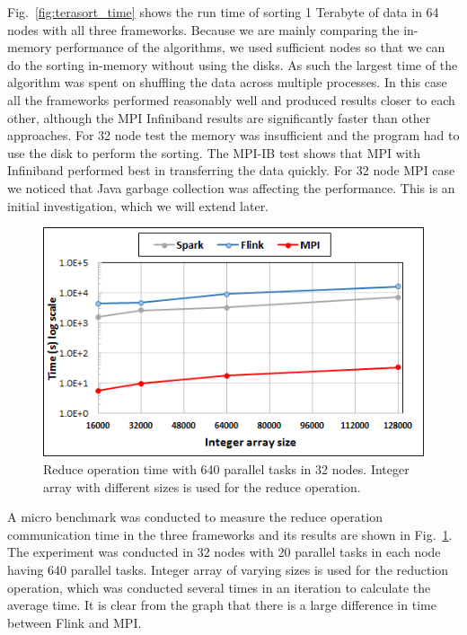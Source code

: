 \documentclass[conference]{IEEEtran}
\begin{document}
Fig.~\ref{fig:terasort_time} shows the run time of sorting 1 Terabyte of data in 64 nodes with all three frameworks. Because we are mainly comparing the in-memory performance of the algorithms, we used sufficient nodes so that we can do the sorting in-memory without using the disks. As such the largest time of the algorithm was spent on shuffling the data across multiple processes. In this case all the frameworks performed reasonably well and produced results closer to each other, although the MPI Infiniband results are significantly faster than other approaches. For 32 node test the memory was insufficient and the program had to use the disk to perform the sorting. The MPI-IB test shows that MPI with Infiniband performed best in transferring the data quickly. For 32 node MPI case we noticed that Java garbage collection was affecting the performance. This is an initial investigation, which we will extend later.

\begin{figure}
    \centering
    \includegraphics[width=0.9\columnwidth]{images/reduce.png}
  \caption{Reduce operation time with 640 parallel tasks in 32 nodes. Integer array with different sizes is used for the reduce operation.}
    \label{fig:reduce_time}
\end{figure}

A micro benchmark was conducted to measure the reduce operation communication time in the three frameworks and its results are shown in Fig.~\ref{fig:reduce_time}. The experiment was conducted in 32 nodes with 20 parallel tasks in each node having 640 parallel tasks. Integer array of varying sizes is used for the reduction operation, which was conducted several times in an iteration to calculate the average time. It is clear from the graph that there is a large difference in time between Flink and MPI.
\end{document}
